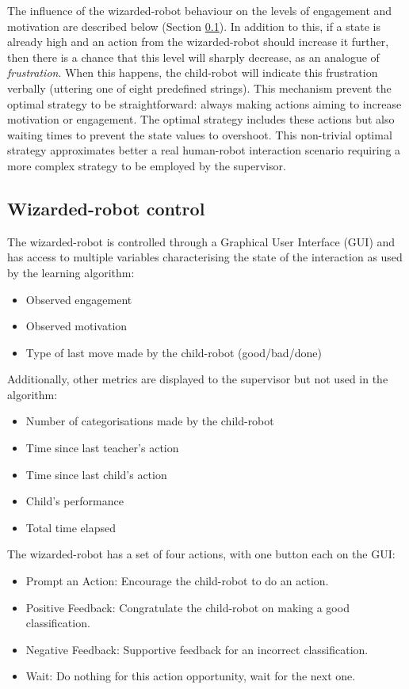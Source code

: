 The influence of the wizarded-robot behaviour on the levels of engagement and motivation are described below (Section \ref{ssec:woz_wizarded_robot}). In addition to this, if a state is already high and an action from the wizarded-robot should increase it further, then there is a chance that this level will sharply decrease, as an analogue of \textit{frustration}. When this happens, the child-robot will indicate this frustration verbally (uttering one of eight predefined strings). This mechanism prevent the optimal strategy to be straightforward: always making actions aiming to increase motivation or engagement. The optimal strategy includes these actions but also waiting times to prevent the state values to overshoot. This non-trivial optimal strategy approximates better a real human-robot interaction scenario requiring a more complex strategy to be employed by the supervisor.

\subsection{Wizarded-robot control}
\label{ssec:woz_wizarded_robot}
The wizarded-robot is controlled through a Graphical User Interface (GUI) and has access to multiple variables characterising the state of the interaction as used by the learning algorithm:
\begin{itemize}
	\item Observed engagement
	\item Observed motivation
	\item Type of last move made by the child-robot (good/bad/done)
\end{itemize}
Additionally, other metrics are displayed to the supervisor but not used in the algorithm:
\begin{itemize}
	\item Number of categorisations made by the child-robot
	\item Time since last teacher's action
	\item Time since last child's action
	\item Child's performance
	\item Total time elapsed
\end{itemize}


The wizarded-robot has a set of four actions, with one button each on the GUI: 
\begin{itemize}
	\item Prompt an Action: Encourage the child-robot to do an action.
	\item Positive Feedback: Congratulate the child-robot on making a good classification.
	\item Negative Feedback: Supportive feedback for an incorrect classification.
	\item Wait: Do nothing for this action opportunity, wait for the next one.
\end{itemize}

